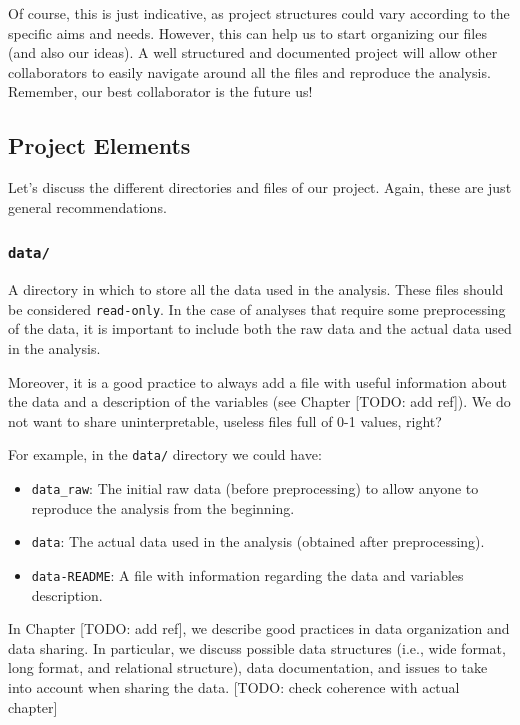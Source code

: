 \documentclass[
  11pt,
]{book}
\providecommand{\tightlist}{%
  \setlength{\itemsep}{0pt}\setlength{\parskip}{0pt}}
\begin{document}
Of course, this is just indicative, as project structures could vary according to the specific aims and needs. However, this can help us to start organizing our files (and also our ideas). A well structured and documented project will allow other collaborators to easily navigate around all the files and reproduce the analysis. Remember, our best collaborator is the future us!

\hypertarget{project-elements}{%
\subsection{Project Elements}\label{project-elements}}

Let's discuss the different directories and files of our project. Again, these are just general recommendations.

\hypertarget{data}{%
\subsubsection{\texorpdfstring{\texttt{data/}}{data/}}\label{data}}

A directory in which to store all the data used in the analysis. These files should be considered \texttt{read-only}. In the case of analyses that require some preprocessing of the data, it is important to include both the raw data and the actual data used in the analysis.

Moreover, it is a good practice to always add a file with useful information about the data and a description of the variables (see Chapter {[}TODO: add ref{]}). We do not want to share uninterpretable, useless files full of 0-1 values, right?

For example, in the \texttt{data/} directory we could have:

\begin{itemize}
\tightlist
\item
  \texttt{data\_raw}: The initial raw data (before preprocessing) to allow anyone to reproduce the analysis from the beginning.
\item
  \texttt{data}: The actual data used in the analysis (obtained after preprocessing).
\item
  \texttt{data-README}: A file with information regarding the data and variables description.
\end{itemize}

In Chapter {[}TODO: add ref{]}, we describe good practices in data organization and data sharing. In particular, we discuss possible data structures (i.e., wide format, long format, and relational structure), data documentation, and issues to take into account when sharing the data. {[}TODO: check coherence with actual chapter{]}
\end{document}
